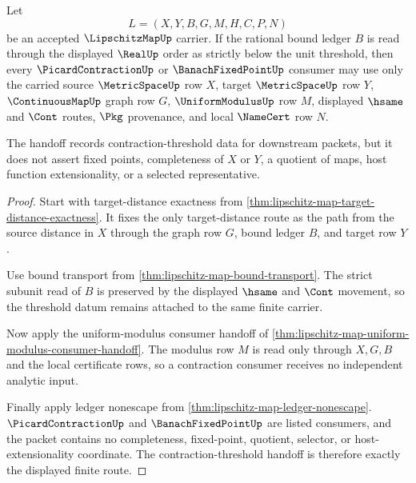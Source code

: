 \begin{theorem}
\label{thm:lipschitz-map-contraction-threshold-handoff}
Let
$$
L=(X,Y,B,G,M,H,C,P,N)
$$
be an accepted $\LipschitzMapUp$ carrier. If the rational bound ledger $B$ is
read through the displayed $\RealUp$ order as strictly below the unit
threshold, then every $\PicardContractionUp$ or $\BanachFixedPointUp$ consumer
may use only the carried source $\MetricSpaceUp$ row $X$, target
$\MetricSpaceUp$ row $Y$, $\ContinuousMapUp$ graph row $G$,
$\UniformModulusUp$ row $M$, displayed $\hsame$ and $\Cont$ routes, $\Pkg$
provenance, and local $\NameCert$ row $N$.

The handoff records contraction-threshold data for downstream packets, but it
does not assert fixed points, completeness of $X$ or $Y$, a quotient of maps,
host function extensionality, or a selected representative.
\end{theorem}
\begin{proof}
Start with target-distance exactness from
\autoref{thm:lipschitz-map-target-distance-exactness}. It fixes the only
target-distance route as the path from the source distance in $X$ through the
graph row $G$, bound ledger $B$, and target row $Y$.

Use bound transport from \autoref{thm:lipschitz-map-bound-transport}. The
strict subunit read of $B$ is preserved by the displayed $\hsame$ and $\Cont$
movement, so the threshold datum remains attached to the same finite carrier.

Now apply the uniform-modulus consumer handoff of
\autoref{thm:lipschitz-map-uniform-modulus-consumer-handoff}. The modulus row
$M$ is read only through $X,G,B$ and the local certificate rows, so a
contraction consumer receives no independent analytic input.

Finally apply ledger nonescape from
\autoref{thm:lipschitz-map-ledger-nonescape}. $\PicardContractionUp$ and
$\BanachFixedPointUp$ are listed consumers, and the packet contains no
completeness, fixed-point, quotient, selector, or host-extensionality
coordinate. The contraction-threshold handoff is therefore exactly the
displayed finite route.
\end{proof}

